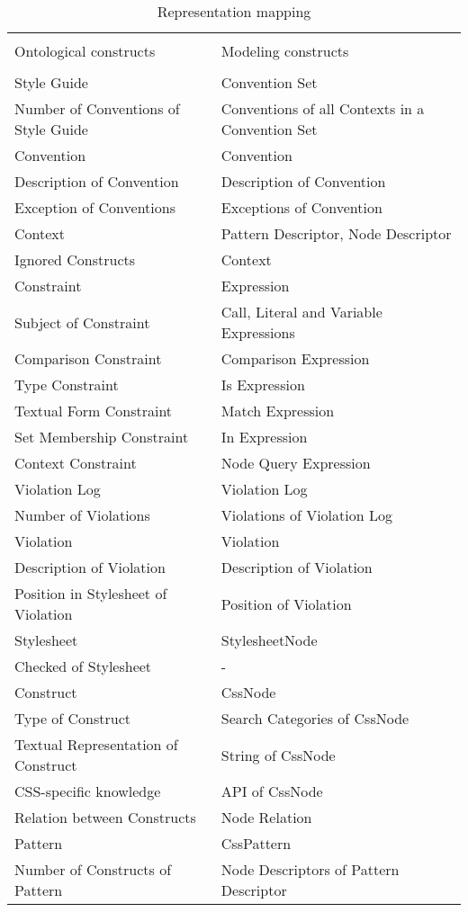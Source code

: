 \documentclass[parskip=full]{uvamscse}
\begin{document}
\begin{center}
\begin{longtable}{ | p{17em} | p{23em} | } 
\caption{Representation mapping}
\label{tab:representation}\\
\hline
 &  \\
Ontological constructs & Modeling constructs \\
 &  \\
\hline
Style Guide & Convention Set \\ \hline
Number of Conventions of Style Guide & Conventions of all Contexts in a Convention Set \\ \hline
Convention & Convention \\ \hline
Description of Convention & Description of Convention \\ \hline
Exception of Conventions & Exceptions of Convention \\ \hline
Context & Pattern Descriptor, Node Descriptor \\ \hline
Ignored Constructs & Context \\ \hline
Constraint & Expression \\ \hline
Subject of Constraint & Call, Literal and Variable Expressions \\ \hline
Comparison Constraint & Comparison Expression \\ \hline
Type Constraint & Is Expression \\ \hline
Textual Form Constraint & Match Expression \\ \hline
Set Membership Constraint & In Expression \\ \hline
Context Constraint & Node Query Expression \\ \hline
Violation Log & Violation Log \\ \hline
Number of Violations & Violations of Violation Log \\ \hline
Violation & Violation \\ \hline
Description of Violation & Description of Violation \\ \hline
Position in Stylesheet of Violation & Position of Violation \\ \hline
Stylesheet & StylesheetNode \\ \hline
Checked of Stylesheet & - \\ \hline
Construct & CssNode \\ \hline
Type of Construct & Search Categories of CssNode \\ \hline
Textual Representation of Construct & String of CssNode \\ \hline
CSS-specific knowledge & API of CssNode \\ \hline
Relation between Constructs & Node Relation \\ \hline
Pattern & CssPattern \\ \hline
Number of Constructs of Pattern & Node Descriptors of Pattern Descriptor \\ \hline

\end{longtable}
\end{center}
\end{document}
